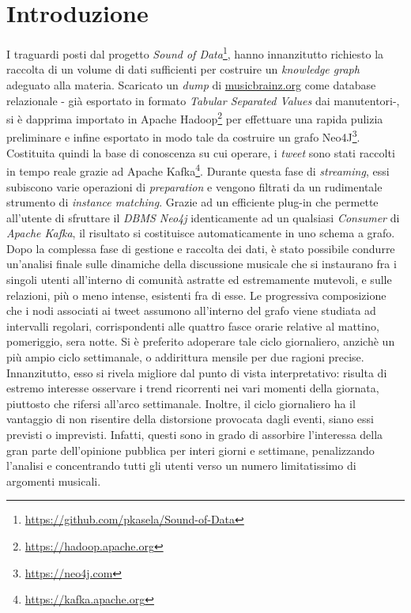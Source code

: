 \documentclass[12pt, a4paper, twocolumn]{article} %
\begin{document}
\part{Introduzione}
I traguardi posti dal progetto \textit{Sound of Data}\footnote{\url{https://github.com/pkasela/Sound-of-Data}}, hanno innanzitutto richiesto la raccolta di un volume di dati sufficienti per costruire un \textit{knowledge graph} adeguato alla materia. Scaricato un \textit{dump} di \url{musicbrainz.org} come database relazionale - già esportato in formato \textit{Tabular Separated Values} dai manutentori-, si è dapprima importato in Apache Hadoop\footnote{\url{https://hadoop.apache.org}} per effettuare una rapida pulizia preliminare e infine esportato in modo tale da costruire un grafo Neo4J\footnote{\url{https://neo4j.com}}.
Costituita quindi la base di conoscenza su cui operare, i \textit{tweet} sono stati raccolti in tempo reale grazie ad Apache Kafka\footnote{\url{https://kafka.apache.org}}. Durante questa fase di \textit{streaming}, essi subiscono varie operazioni di \textit{preparation} e vengono filtrati da un rudimentale strumento di \textit{instance matching}. Grazie ad un efficiente plug-in che permette all'utente di sfruttare il \textit{DBMS Neo4j} identicamente ad un qualsiasi \textit{Consumer} di \textit{Apache Kafka}, il risultato si costituisce automaticamente in uno schema a grafo. Dopo la complessa fase di gestione e raccolta dei dati, è stato possibile condurre un'analisi finale sulle dinamiche della discussione musicale che si instaurano fra i singoli utenti all'interno di comunità astratte ed estremamente mutevoli, e sulle relazioni, più o meno intense, esistenti fra di esse. Le progressiva composizione che i nodi associati ai tweet assumono all'interno del grafo viene studiata ad intervalli regolari, corrispondenti alle quattro fasce orarie relative al mattino, pomeriggio, sera notte. Si è preferito adoperare tale ciclo giornaliero, anzichè un più ampio ciclo settimanale, o addirittura mensile per due ragioni precise. Innanzitutto, esso si rivela migliore dal punto di vista interpretativo: risulta di estremo interesse osservare i trend ricorrenti nei vari momenti della giornata, piuttosto che rifersi all'arco settimanale. Inoltre, il ciclo giornaliero ha il vantaggio di non risentire della distorsione provocata dagli eventi, siano essi previsti o imprevisti. Infatti, questi sono in grado di assorbire l'interessa della gran parte dell'opinione pubblica per interi giorni e settimane, penalizzando l'analisi e concentrando tutti gli utenti verso un numero limitatissimo di argomenti musicali.\ 
\end{document}
